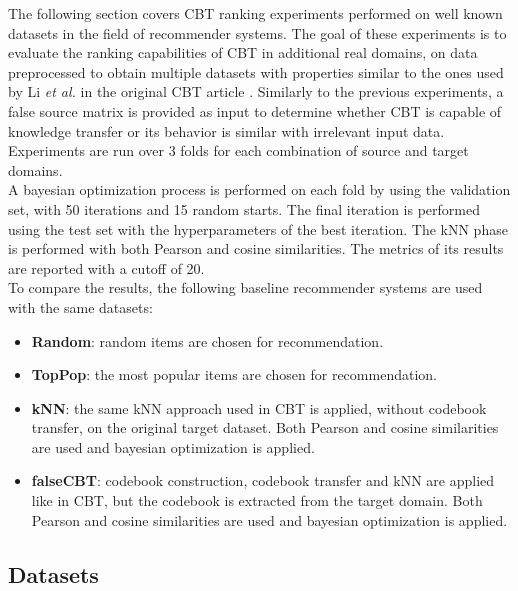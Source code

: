 The following section covers CBT ranking experiments performed on well known datasets in the field of recommender systems. The goal of these experiments is to evaluate the ranking capabilities of CBT in additional real domains, on data preprocessed to obtain multiple datasets with properties similar to the ones used by Li \textit{et al.} in the original CBT article \cite{10.5555/1661445.1661773}. Similarly to the previous experiments, a false source matrix is provided as input to determine whether CBT is capable of knowledge transfer or its behavior is similar with irrelevant input data.\\
Experiments are run over 3 folds for each combination of source and target domains.\\
A bayesian optimization process is performed on each fold by using the validation set, with 50 iterations and 15 random starts. The final iteration is performed using the test set with the hyperparameters of the best iteration. The kNN phase is performed with both Pearson and cosine similarities. The metrics of its results are reported with a cutoff of 20.\\
To compare the results, the following baseline recommender systems are used with the same datasets:
\begin{itemize}
\item \textbf{Random}: random items are chosen for recommendation.
\item \textbf{TopPop}: the most popular items are chosen for recommendation.
\item \textbf{kNN}: the same kNN approach used in CBT is applied, without codebook transfer, on the original target dataset. Both Pearson and cosine similarities are used and bayesian optimization is applied.
\item \textbf{falseCBT}: codebook construction, codebook transfer and kNN are applied like in CBT, but the codebook is extracted from the target domain. Both Pearson and cosine similarities are used and bayesian optimization is applied.
\end{itemize}


\subsection{Datasets}

